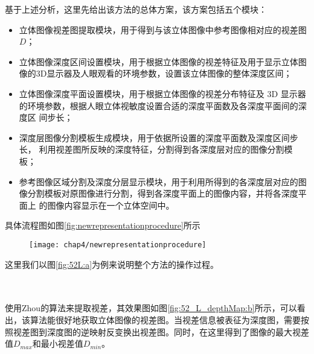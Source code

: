 基于上述分析，这里先给出该方法的总体方案，该方案包括五个模块：
\begin{itemize}[noitemsep,topsep=0pt,parsep=0pt,partopsep=0pt]
\item 立体图像视差图提取模块，用于得到与该立体图像中参考图像相对应的视差图 $D$；
\item 立体图像深度区间设置模块，用于根据立体图像的视差特征及用于显示立体图
像的3D显示器及人眼观看的环境参数，设置该立体图像的整体深度区间； 
\item 立体图像深度平面设置模块，用于根据立体图像的视差分布特征及 3D 显示器
的环境参数，根据人眼立体视敏度设置合适的深度平面数及各深度平面间的深度区 间步长；
\item 深度层图像分割模板生成模块，用于依据所设置的深度平面数及深度区间步长，
利用视差图所反映的深度特征，分割得到各深度层对应的图像分割模板；
\item 参考图像区域分割及深度分层显示模块，用于利用所得到的各深度层对应的图
像分割模板对原图像进行分割，得到各深度平面上的图像内容，并将各深度平面上 的图像内容显示在一个立体空间中。
\end{itemize}
具体流程图如图\ref{fig:newrepresentationprocedure}所示
\begin{figure}[ht]
  \centering
  \texttt{[image: chap4/newrepresentationprocedure]}
\end{figure}
这里我们以图\ref{fig:52L:a}为例来说明整个方法的操作过程。
\begin{figure}
  \centering
  \hspace{1in}
\end{figure}
\\[0.2cm]
\\[0.2cm]
使用Zhou\parencite{zhou2015depth}的算法来提取视差，其效果图如图\ref{fig:52_L_depthMap:b}所示，可以看出，该算法能很好地获取立体图像的视差图。当视差信息被表征为深度图，需要按照视差图到深度图的逆映射反变换出视差图。同时，在这里得到了图像的最大视差值$D_{max}$和最小视差值$D_{min}$。
